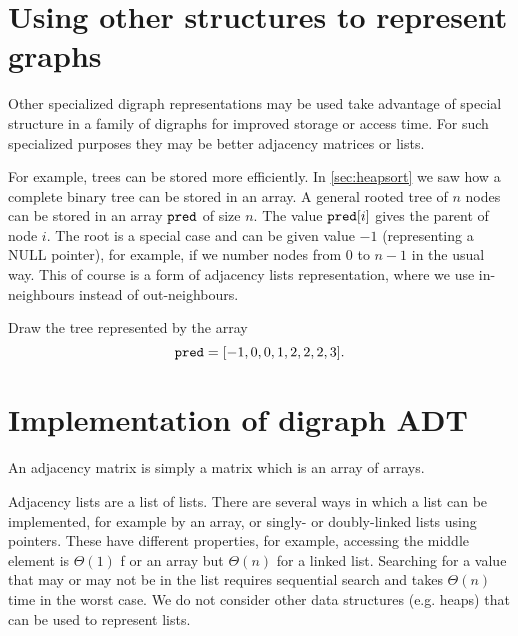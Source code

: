 \section{Using other structures to represent graphs}

Other specialized digraph representations may be used take advantage of
special structure in a family of digraphs for improved storage or access time. For such specialized
purposes they may be better adjacency matrices or lists.

For example, trees can be stored more efficiently. In \cref{sec:heapsort} we saw how a complete binary tree can be
stored in an array. A general rooted tree of $n$ nodes can be stored in
an array $\operatorname{\text{\texttt{pred}}}$ of size $n$. The value $\operatorname{\text{\texttt{pred}}}[i]$ gives the parent of
node $i$. The root is a special case and can be given value $-1$
(representing a NULL pointer), for example, if we number nodes from $0$
to $n-1$ in the usual way. This of course is a form of adjacency lists
representation, where we use in-neighbours instead of out-neighbours.

\begin{Boxample}[4]
Draw the tree represented by the array $$\operatorname{\text{\texttt{pred}}} = [-1,0,0,1,2,2,2,3]\text{.}$$
\end{Boxample}


\section{Implementation of digraph ADT} \label{sec:graphadtimpl}
An adjacency matrix is simply a matrix which is an array of arrays. 

Adjacency lists are a list of lists. 
There are several ways in which a list can be implemented, for
example by an array, or singly- or doubly-linked lists using pointers.  
These have different properties, for example, accessing the middle element is $\Theta(1)$ f
or an array but $\Theta(n)$ for a linked list. 
Searching for a value that may or may not be in the list requires sequential search
and takes $\Theta(n)$ time in the worst case. 
%
We do not consider other data structures (e.g. heaps) that can be used to represent lists. 

